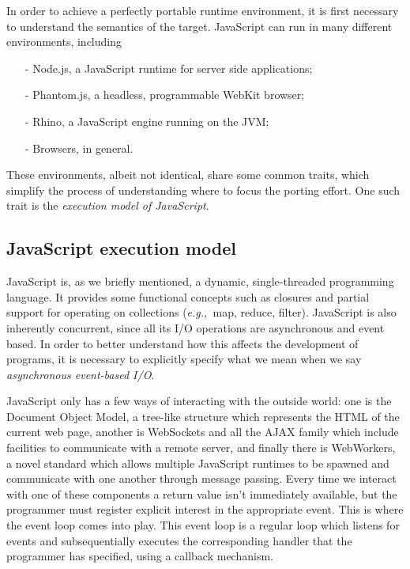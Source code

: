 \documentclass{sig-alternate}
\newcommand{\eg}{{\em e.g.,~}}
\begin{document}
In order to achieve a perfectly portable runtime environment, it is first necessary to understand the semantics of the target.
JavaScript can run in many different environments, including
\begin{itemize}
\item[-]{Node.js, a JavaScript runtime for server side applications;}
\item[-]{Phantom.js, a headless, programmable WebKit browser;}
\item[-]{Rhino, a JavaScript engine running on the JVM;}
\item[-]{Browsers, in general.}
\end{itemize}
These environments, albeit not identical, share some common traits, which simplify the process of understanding where to focus the porting effort. One such trait is the \textit{execution model of JavaScript}.

\subsection{JavaScript execution model}

JavaScript is, as we briefly mentioned, a dynamic, single-threaded programming language. It provides some functional concepts such as closures and partial support for operating on collections (\eg map, reduce, filter).
JavaScript is also inherently concurrent, since all its I/O operations are asynchronous and event based.
In order to better understand how this affects the development of programs, it is necessary to explicitly specify what we mean when we say \textit{asynchronous event-based I/O}.

JavaScript only has a few ways of interacting with the outside world: one is the Document Object Model, a tree-like structure which represents the HTML of the current web page, another is WebSockets and all the AJAX family which include facilities to communicate with a remote server, and finally there is WebWorkers, a novel standard which allows multiple JavaScript runtimes to be spawned and communicate with one another through message passing.
Every time we interact with one of these components a return value isn't immediately available, but the programmer must register explicit interest in the appropriate event. This is where the event loop comes into play. This event loop is a regular loop which listens for events and subsequentially executes the corresponding handler that the programmer has specified, using a callback mechanism.
\end{document}
